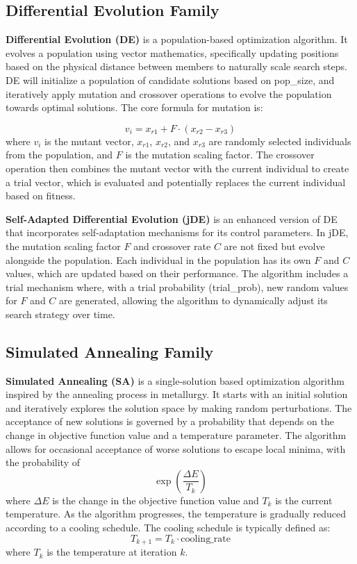\documentclass{article}
\begin{document}
\subsection*{Differential Evolution Family}

\textbf{Differential Evolution (DE)} is a population-based optimization algorithm. It evolves a population using vector mathematics, specifically updating positions based on the physical distance between members to naturally scale search steps. DE will initialize a population of candidate solutions based on pop\_size, and iteratively apply mutation and crossover operations to evolve the population towards optimal solutions. The core formula for mutation is:

\[v_{i} = x_{r1} + F \cdot (x_{r2} - x_{r3})\]
where $v_i$ is the mutant vector, $x_{r1}$, $x_{r2}$, and $x_{r3}$ are randomly selected individuals from the population, and $F$ is the mutation scaling factor. The crossover operation then combines the mutant vector with the current individual to create a trial vector, which is evaluated and potentially replaces the current individual based on fitness.

\textbf{Self-Adapted Differential Evolution (jDE)} is an enhanced version of DE that incorporates self-adaptation mechanisms for its control parameters. In jDE, the mutation scaling factor $F$ and crossover rate $C$ are not fixed but evolve alongside the population. Each individual in the population has its own $F$ and $C$ values, which are updated based on their performance. The algorithm includes a trial mechanism where, with a trial probability (trial\_prob), new random values for $F$ and $C$ are generated, allowing the algorithm to dynamically adjust its search strategy over time.

\subsection*{Simulated Annealing Family}

\textbf{Simulated Annealing (SA)} is a single-solution based optimization algorithm inspired by the annealing process in metallurgy. It starts with an initial solution and iteratively explores the solution space by making random perturbations. The acceptance of new solutions is governed by a probability that depends on the change in objective function value and a temperature parameter. The algorithm allows for occasional acceptance of worse solutions to escape local minima, with the probability of 
\[\exp\left(\frac{\Delta E}{T_k}\right)\]
where $\Delta E$ is the change in the objective function value and $T_k$ is the current temperature. As the algorithm progresses, the temperature is gradually reduced according to a cooling schedule. The cooling schedule is typically defined as:
\[T_{k+1} = T_k \cdot \text{cooling\_rate}\]
where $T_k$ is the temperature at iteration $k$.
\end{document}
